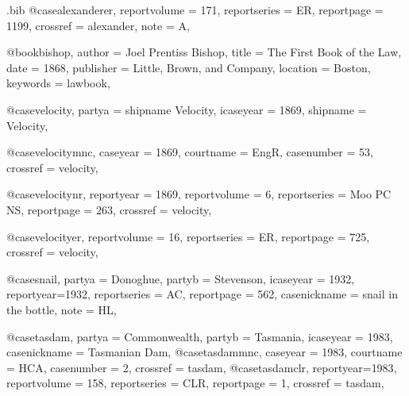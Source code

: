 \begin{filecontents*}[overwrite]{\jobname.bib}
@case{alexanderer,
  reportvolume = {171},
  reportseries = {ER},
  reportpage = {1199},
  crossref = {alexander},
  note = {A},
}




@book{bishop,
author = {Joel Prentiss Bishop},
title = {The First Book of the Law},
date = {1868},
publisher = {Little, Brown, and Company},
location = {Boston},
keywords = {lawbook},
}


@case{velocity,
  partya = {shipname Velocity},
  icaseyear = {1869},
  shipname = {Velocity},
	}

@case{velocitymnc,
  caseyear = {1869},
  courtname = {EngR},
  casenumber = {53},
  crossref = {velocity},
}


@case{velocitynr,
  reportyear = {1869},
  reportvolume = {6},
  reportseries = {Moo PC NS},
  reportpage = {263},
  crossref = {velocity},
}

@case{velocityer,
  reportvolume = {16},
  reportseries = {ER},
  reportpage = {725},
  crossref = {velocity},
}





@case{snail,
  partya = {Donoghue}, 
  partyb = {Stevenson},
  icaseyear = {1932},
  reportyear={1932},
  reportseries = {AC},
  reportpage = {562},
  casenickname = {snail in the bottle},
  note = {HL},
	}


@case{tasdam,
  partya = {Commonwealth}, 
  partyb = {Tasmania},
  icaseyear = {1983},
  casenickname = {Tasmanian Dam},
  }
@case{tasdammnc,
  caseyear = {1983},
  courtname = {HCA},
  casenumber = {2},
  crossref = {tasdam},
  }
@case{tasdamclr,
  reportyear={1983},
  reportvolume = {158},
  reportseries = {CLR},
  reportpage = {1},
  crossref = {tasdam},
  	}


\end{filecontents*}
